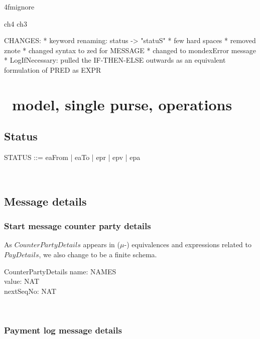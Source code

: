 \ai4fmignore{
\begin{zsection}
  \SECTION ch4 \parents ch3
\end{zsection}
CHANGES:
* keyword renaming: status -> "statuS" 
* few hard spaces
* removed znote
* changed syntax to zed for MESSAGE
* changed \bot to mondexError message
* LogIfNecessary: pulled the IF-THEN-ELSE outwards as an equivalent formulation of PRED as EXPR
}

\chapter{\Betw\ model, single purse, operations}\label{ch4}

\section{Status}

\begin{LFType}
\begin{zed}
   STATUS ::= eaFrom | eaTo | epr | epv | epa
\end{zed}~\end{LFType}

\section{Message details}\label{ch4.msgdetails}

\subsection{Start message counter party details}

As $CounterPartyDetails$ appears in ($\mu$-) equivalences
and expressions related to $PayDetails$, we also change
to be a finite schema.
%
\begin{LSDef}
\begin{schema}{CounterPartyDetails}
   name: NAMES \\
   value: NAT \\
   nextSeqNo: NAT
\end{schema}~\end{LSDef}

\subsection{Payment log message details}

